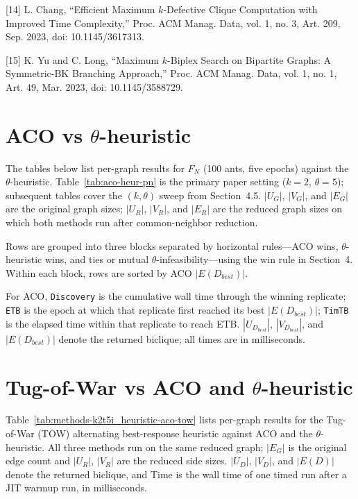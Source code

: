 \documentclass[conference]{IEEEtran}
\begin{document}
[14] L. Chang, “Efficient Maximum $k$-Defective Clique Computation with Improved Time Complexity,” Proc. ACM Manag. Data, vol. 1, no. 3, Art. 209, Sep. 2023, doi: 10.1145/3617313.
\

[15] K. Yu and C. Long, “Maximum $k$-Biplex Search on Bipartite Graphs: A Symmetric-BK Branching Approach,” Proc. ACM Manag. Data, vol. 1, no. 1, Art. 49, Mar. 2023, doi: 10.1145/3588729.

\appendix
\renewcommand{\thesection}{Appendix \Alph{section}}

\section{ACO vs $\theta$-heuristic}

The tables below list per-graph results for $F_N$ (100 ants, five epochs) against the $\theta$-heuristic. Table~\ref{tab:aco-heur-pn} is the primary paper setting ($k=2$, $\theta=5$); subsequent tables cover the $(k, \theta)$ sweep from Section~4.5. $|U_G|$, $|V_G|$, and $|E_G|$ are the original graph sizes; $|U_R|$, $|V_R|$, and $|E_R|$ are the reduced graph sizes on which both methods run after common-neighbor reduction.

Rows are grouped into three blocks separated by horizontal rules---ACO wins, $\theta$-heuristic wins, and ties or mutual $\theta$-infeasibility---using the win rule in Section~4. Within each block, rows are sorted by ACO $|E(D_{best})|$.

For ACO, \texttt{Discovery} is the cumulative wall time through the winning replicate; \texttt{ETB} is the epoch at which that replicate first reached its best $|E(D_{best})|$; \texttt{TimTB} is the elapsed time within that replicate to reach ETB. $|U_{D_{best}}|$, $|V_{D_{best}}|$, and $|E(D_{best})|$ denote the returned biclique; all times are in milliseconds.







\section{Tug-of-War vs ACO and $\theta$-heuristic}

Table~\ref{tab:methods-k2t5i_heuristic-aco-tow} lists per-graph results for the Tug-of-War (TOW) alternating best-response heuristic against ACO and the $\theta$-heuristic. All three methods run on the same reduced graph; $|E_G|$ is the original edge count and $|U_R|$, $|V_R|$ are the reduced side sizes. $|U_D|$, $|V_D|$, and $|E(D)|$ denote the returned biclique, and Time is the wall time of one timed run after a JIT warmup run, in milliseconds.
\end{document}
